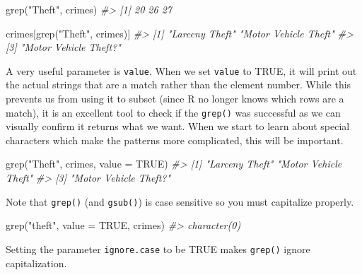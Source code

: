 \documentclass[
  12pt,
  openany]{book}
\newenvironment{Shaded}{\begin{snugshade}}{\end{snugshade}}
\newcommand{\AttributeTok}[1]{\textcolor[rgb]{0.61,0.61,0.61}{#1}}
\newcommand{\CommentTok}[1]{\textcolor[rgb]{0.37,0.37,0.37}{\textit{#1}}}
\newcommand{\ConstantTok}[1]{\textcolor[rgb]{0,0,0}{#1}}
\newcommand{\FunctionTok}[1]{\textcolor[rgb]{0,0,0}{#1}}
\newcommand{\NormalTok}[1]{#1}
\newcommand{\StringTok}[1]{\textcolor[rgb]{0.5,0.5,0.5}{#1}}
\begin{document}
\begin{Shaded}
\begin{Highlighting}[]
\FunctionTok{grep}\NormalTok{(}\StringTok{"Theft"}\NormalTok{, crimes)}
\CommentTok{\#\textgreater{} [1] 20 26 27}
\end{Highlighting}
\end{Shaded}

\begin{Shaded}
\begin{Highlighting}[]
\NormalTok{crimes[}\FunctionTok{grep}\NormalTok{(}\StringTok{"Theft"}\NormalTok{, crimes)]}
\CommentTok{\#\textgreater{} [1] "Larceny Theft"        "Motor Vehicle Theft" }
\CommentTok{\#\textgreater{} [3] "Motor Vehicle Theft?"}
\end{Highlighting}
\end{Shaded}

A very useful parameter is \texttt{value}. When we set \texttt{value} to TRUE, it will print out the actual strings that are a match rather than the element number. While this prevents us from using it to subset (since R no longer knows which rows are a match), it is an excellent tool to check if the \texttt{grep()} was successful as we can visually confirm it returns what we want. When we start to learn about special characters which make the patterns more complicated, this will be important.

\begin{Shaded}
\begin{Highlighting}[]
\FunctionTok{grep}\NormalTok{(}\StringTok{"Theft"}\NormalTok{, crimes, }\AttributeTok{value =} \ConstantTok{TRUE}\NormalTok{)}
\CommentTok{\#\textgreater{} [1] "Larceny Theft"        "Motor Vehicle Theft" }
\CommentTok{\#\textgreater{} [3] "Motor Vehicle Theft?"}
\end{Highlighting}
\end{Shaded}

Note that \texttt{grep()} (and \texttt{gsub()}) is case sensitive so you must capitalize properly.

\begin{Shaded}
\begin{Highlighting}[]
\FunctionTok{grep}\NormalTok{(}\StringTok{"theft"}\NormalTok{, }\AttributeTok{value =} \ConstantTok{TRUE}\NormalTok{, crimes)}
\CommentTok{\#\textgreater{} character(0)}
\end{Highlighting}
\end{Shaded}

Setting the parameter \texttt{ignore.case} to be TRUE makes \texttt{grep()} ignore capitalization.
\end{document}
